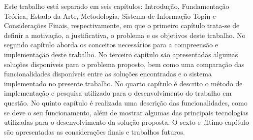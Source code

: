 Este trabalho está separado em seis capítulos: Introdução, Fundamentação Teórica, Estado da Arte, Metodologia, Sistema de Informação Topin e Considerações Finais, respectivamente, em que o primeiro capítulo trata-se de definir a motivação, a justificativa, o problema e os objetivos deste trabalho. No segundo capítulo aborda os conceitos necessários para a compreensão e implementação deste trabalho. No terceiro capítulo são apresentadas algumas soluções disponíveis para o problema proposto, bem como uma comparação das funcionalidades disponíveis entre as soluções encontradas e o sistema implementado no presente trabalho. No quarto capítulo é descrito o método de implementação e pesquisa utilizado para o desenvolvimento do trabalho em questão. No quinto capítulo é realizada uma descrição das funcionalidades, como se deve o seu funcionamento, além de mostrar algumas das principais tecnologias utilizadas para o desenvolvimento da solução proposta. O sexto e último capítulo são apresentadas as considerações finais e trabalhos futuros.